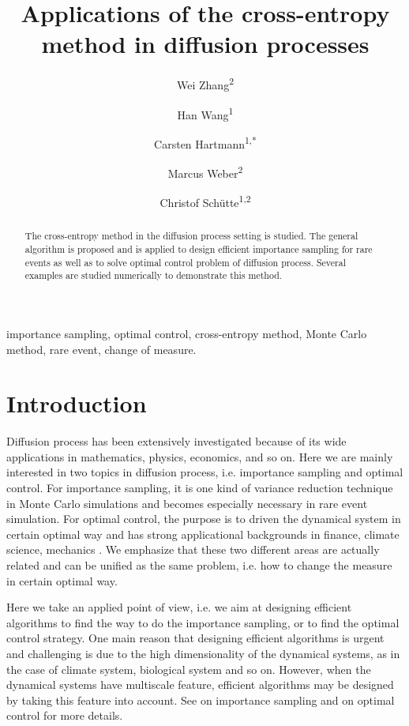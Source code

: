 \documentclass[final]{siamltex}
\begin{document}
\title{Applications of the cross-entropy method in diffusion processes}
\author{Wei Zhang\textsuperscript{2}\and Han Wang\textsuperscript{1} \and
  Carsten Hartmann\textsuperscript{1,*}\and 
Marcus Weber\textsuperscript{2}\and Christof Sch\"{u}tte\textsuperscript{1,2}}
\renewcommand{\thefootnote}{\fnsymbol{footnote}}
\date{}
\maketitle
\begin{abstract}
  The cross-entropy method in the diffusion process setting is studied. The
  general algorithm is proposed and is applied to design efficient importance sampling for rare events as well as to solve optimal
  control problem of diffusion process. Several examples are studied
  numerically to demonstrate this method.
\end{abstract}
\begin{keywords}
importance sampling, optimal control, cross-entropy method, Monte Carlo
method, rare event, change of measure. 
\end{keywords}
\begin{AMS}
\end{AMS}
\section{Introduction}
\label{intro}
Diffusion process has been extensively investigated because of its wide
applications in mathematics, physics, economics, and so on.
Here we are mainly interested in two topics in diffusion process, i.e. importance sampling and optimal control. 
For importance sampling, it is one kind of variance reduction technique 
in Monte Carlo simulations and becomes especially necessary in rare event simulation.
For optimal control, the purpose is to driven the dynamical system in certain
optimal way and has strong applicational backgrounds in finance, climate
science, mechanics \cite{fleming2006}. We emphasize that these two different areas are actually related and can
be unified as the same problem, i.e. how to change the measure in certain optimal way.

Here we take an applied point of view, i.e. we aim at designing efficient
algorithms to find the way to do the importance sampling, or to find the
optimal control strategy. One main reason that designing efficient algorithms
is urgent and challenging is due to the high dimensionality of the dynamical
systems, as in the case of climate system, biological system and so on. However, when the dynamical
systems have multiscale feature, efficient algorithms may be designed by
taking this feature into account. See \cite{ip-dupuis-multiscale, ip-eric,
zhws13} on importance sampling and \cite{control_schuette, zlph2013} on
optimal control for more details.
\end{document}
